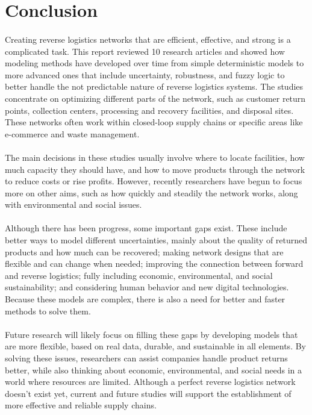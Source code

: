 \section{Conclusion}

\paragraph{} Creating reverse logistics networks that are efficient, effective, and strong is a complicated task. This report reviewed 10 research articles and showed how modeling methods have developed over time from simple deterministic models to more advanced ones that include uncertainty, robustness, and fuzzy logic to better handle the not predictable nature of reverse logistics systems. The studies concentrate on optimizing different parts of the network, such as customer return points, collection centers, processing and recovery facilities, and disposal sites. These networks often work within closed-loop supply chains or specific areas like e-commerce and waste management.

\paragraph{} The main decisions in these studies usually involve where to locate facilities, how much capacity they should have, and how to move products through the network to reduce costs or rise profits. However, recently researchers have begun to focus more on other aims, such as how quickly and steadily the network works, along with environmental and social issues.

\paragraph{} Although there has been progress, some important gaps exist. These include better ways to model different uncertainties, mainly about the quality of returned products and how much can be recovered; making network designs that are flexible and can change when needed; improving the connection between forward and reverse logistics; fully including economic, environmental, and social sustainability; and considering human behavior and new digital technologies. Because these models are complex, there is also a need for better and faster methods to solve them.

\paragraph{} Future research will likely focus on filling these gaps by developing models that are more flexible, based on real data, durable, and sustainable in all elements. By solving these issues, researchers can assist companies handle product returns better, while also thinking about economic, environmental, and social needs in a world where resources are limited. Although a perfect reverse logistics network doesn’t exist yet, current and future studies will support the establishment of more effective and reliable supply chains.
